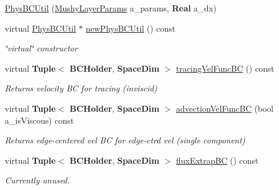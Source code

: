 \begin{DoxyCompactItemize}
\item 
\hyperlink{class_phys_b_c_util_a08574a3a8d645947c3914ef6eb56694f}{Phys\+B\+C\+Util} (\hyperlink{class_mushy_layer_params}{Mushy\+Layer\+Params} a\+\_\+params, \textbf{ Real} a\+\_\+dx)
\item 
\mbox{\label{class_phys_b_c_util_a72d9bf4bce50e114c4a0723bc82c9c3f}} 
virtual \hyperlink{class_phys_b_c_util}{Phys\+B\+C\+Util} $\ast$ \hyperlink{class_phys_b_c_util_a72d9bf4bce50e114c4a0723bc82c9c3f}{new\+Phys\+B\+C\+Util} () const
\begin{DoxyCompactList}\small\item\em \char`\"{}virtual\char`\"{} constructor \end{DoxyCompactList}\item 
\mbox{\label{class_phys_b_c_util_a3b445cfa185191667669389fba825757}} 
virtual \textbf{ Tuple}$<$ \textbf{ B\+C\+Holder}, \textbf{ Space\+Dim} $>$ \hyperlink{class_phys_b_c_util_a3b445cfa185191667669389fba825757}{tracing\+Vel\+Func\+BC} () const
\begin{DoxyCompactList}\small\item\em Returns velocity BC for tracing (inviscid) \end{DoxyCompactList}\item 
\mbox{\label{class_phys_b_c_util_a6229b609a93ec65debb885c418cfba61}} 
virtual \textbf{ Tuple}$<$ \textbf{ B\+C\+Holder}, \textbf{ Space\+Dim} $>$ \hyperlink{class_phys_b_c_util_a6229b609a93ec65debb885c418cfba61}{advection\+Vel\+Func\+BC} (bool a\+\_\+is\+Viscous) const
\begin{DoxyCompactList}\small\item\em Returns edge-\/centered vel BC for edge-\/ctrd vel (single component) \end{DoxyCompactList}\item 
\mbox{\label{class_phys_b_c_util_acdf9562603ca1a20777ddefdb9f7848c}} 
virtual \textbf{ Tuple}$<$ \textbf{ B\+C\+Holder}, \textbf{ Space\+Dim} $>$ \hyperlink{class_phys_b_c_util_acdf9562603ca1a20777ddefdb9f7848c}{flux\+Extrap\+BC} () const
\begin{DoxyCompactList}\small\item\em Currently unused. \end{DoxyCompactList}\item 

\end{DoxyCompactItemize}
